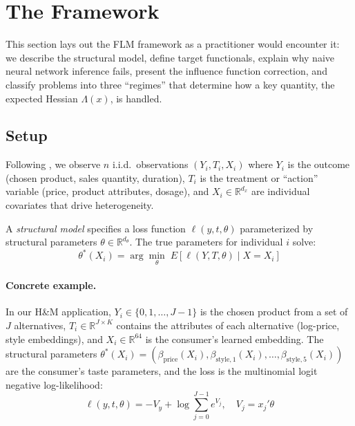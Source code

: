 \section{The Framework}\label{sec:framework}

This section lays out the FLM framework as a practitioner would encounter it: we describe the structural model, define target functionals, explain why naive neural network inference fails, present the influence function correction, and classify problems into three ``regimes'' that determine how a key quantity, the expected Hessian $\Lambda(x)$, is handled.

\subsection{Setup}\label{sec:setup}

Following \citet{farrell2021deep, farrell2025deep}, we observe $n$ i.i.d.\ observations $(Y_i, T_i, X_i)$ where $Y_i$ is the outcome (chosen product, sales quantity, duration), $T_i$ is the treatment or ``action'' variable (price, product attributes, dosage), and $X_i \in \mathbb{R}^{d_x}$ are individual covariates that drive heterogeneity.

A \emph{structural model} specifies a loss function $\ell(y, t, \theta)$ parameterized by structural parameters $\theta \in \mathbb{R}^{d_\theta}$. The true parameters for individual $i$ solve:
\begin{equation}\label{eq:theta_star}
    \theta^*(X_i) = \arg\min_\theta \; E[\ell(Y, T, \theta) \mid X = X_i]
\end{equation}

\paragraph{Concrete example.} In our H\&M application, $Y_i \in \{0, 1, \ldots, J-1\}$ is the chosen product from a set of $J$ alternatives, $T_i \in \mathbb{R}^{J \times K}$ contains the attributes of each alternative (log-price, style embeddings), and $X_i \in \mathbb{R}^{64}$ is the consumer's learned embedding. The structural parameters $\theta^*(X_i) = (\beta_{\text{price}}(X_i), \beta_{\text{style},1}(X_i), \ldots, \beta_{\text{style},5}(X_i))$ are the consumer's taste parameters, and the loss is the multinomial logit negative log-likelihood:
\begin{equation}
    \ell(y, t, \theta) = -V_{y} + \log \sum_{j=0}^{J-1} e^{V_j}, \quad V_j = x_j' \theta
\end{equation}

